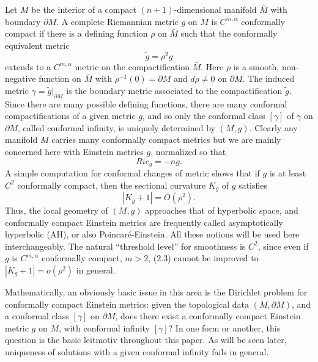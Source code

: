 \documentclass[11pt,amsfonts]{amsart}
\begin{document}
 Let $M$ be the interior of a compact $(n+1)$-dimensional manifold 
$\bar M$ with boundary $\partial M$. A complete Riemannian metric 
$g$ on $M$ is $C^{m,\alpha}$ conformally compact if there is a defining 
function $\rho$ on $\bar M$ such that the conformally equivalent 
metric
\begin{equation} \label{e2.1}
\widetilde g = \rho^{2}g 
\end{equation}
extends to a $C^{m,\alpha}$ metric on the compactification $\bar M$. 
Here $\rho$ is a smooth, non-negative function on $\bar M$ with 
$\rho^{-1}(0) = \partial M$ and $d\rho \neq 0$ on $\partial M$. The 
induced metric $\gamma  = \widetilde g|_{\partial M}$ is the boundary 
metric associated to the compactification $\widetilde g$. Since there 
are many possible defining functions, there are many conformal 
compactifications of a given metric $g$, and so only the conformal class 
$[\gamma]$ of $\gamma$ on $\partial M$, called conformal infinity, is 
uniquely determined by $(M, g)$. Clearly any manifold $M$ carries many 
conformally compact metrics but we are mainly concerned here with Einstein 
metrics $g$, normalized so that
\begin{equation} \label{e2.2}
Ric_{g} = -ng. 
\end{equation}
A simple computation for conformal changes of metric shows that if $g$ 
is at least $C^{2}$ conformally compact, then the sectional curvature 
$K_{g}$ of $g$ satisfies
\begin{equation} \label{e2.3}
|K_{g}+1| = O(\rho^{2}). 
\end{equation}
Thus, the local geometry of $(M, g)$ approaches that of hyperbolic space, 
and conformally compact Einstein metrics are frequently called 
asymptotically hyperbolic (AH), or also Poincar\'e-Einstein. All these 
notions will be used here interchangeably. The natural ``threshold 
level'' for smoothness is $C^{2}$, since even if $g$ is $C^{m,\alpha}$ 
conformally compact, $m > 2$, (2.3) cannot be improved to $|K_{g}+1| = 
o(\rho^{2})$ in general. 

 Mathematically, an obviously basic issue in this area is the Dirichlet 
problem for conformally compact Einstein metrics: given the topological 
data $(M, \partial M)$, and a conformal class $[\gamma]$ on $\partial M$, 
does there exist a conformally compact Einstein metric $g$ on $M$, 
with conformal infinity $[\gamma]$? In one form or another, this 
question is the basic leitmotiv throughout this paper. As will be 
seen later, uniqueness of solutions with a given conformal infinity 
fails in general. 
\end{document}
